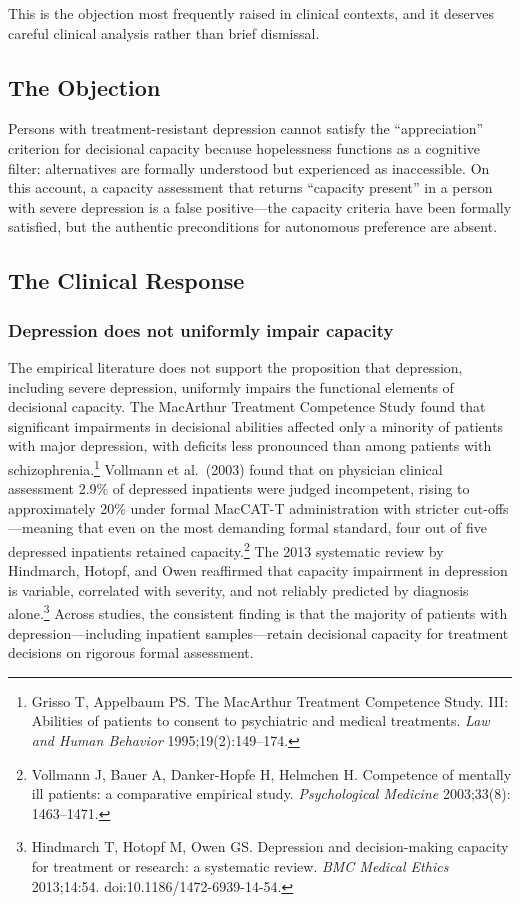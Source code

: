 \documentclass[11pt, letterpaper]{article}
\begin{document}
This is the objection most frequently raised in clinical contexts, and it deserves
careful clinical analysis rather than brief dismissal.

\subsection{The Objection}

Persons with treatment-resistant depression cannot satisfy the ``appreciation'' criterion
for decisional capacity because hopelessness functions as a cognitive filter: alternatives
are formally understood but experienced as inaccessible. On this account, a capacity
assessment that returns ``capacity present'' in a person with severe depression is a
false positive---the capacity criteria have been formally satisfied, but the authentic
preconditions for autonomous preference are absent.

\subsection{The Clinical Response}

\subsubsection{Depression does not uniformly impair capacity}

The empirical literature does not support the proposition that depression, including
severe depression, uniformly impairs the functional elements of decisional capacity.
The MacArthur Treatment Competence Study found that significant impairments in
decisional abilities affected only a minority of patients with major depression, with
deficits less pronounced than among patients with schizophrenia.\footnote{%
  Grisso T, Appelbaum PS. The MacArthur Treatment Competence Study. III: Abilities of
  patients to consent to psychiatric and medical treatments. \textit{Law and Human
  Behavior} 1995;19(2):149--174.}
Vollmann et al.\ (2003) found that on physician clinical assessment 2.9\% of depressed
inpatients were judged incompetent, rising to approximately 20\% under formal MacCAT-T
administration with stricter cut-offs---meaning that even on the most demanding formal
standard, four out of five depressed inpatients retained capacity.\footnote{%
  Vollmann J, Bauer A, Danker-Hopfe H, Helmchen H. Competence of mentally ill
  patients: a comparative empirical study. \textit{Psychological Medicine} 2003;33(8):
  1463--1471.}
The 2013 systematic review by Hindmarch, Hotopf, and Owen reaffirmed that capacity
impairment in depression is variable, correlated with severity, and not reliably
predicted by diagnosis alone.\footnote{%
  Hindmarch T, Hotopf M, Owen GS. Depression and decision-making capacity for treatment
  or research: a systematic review. \textit{BMC Medical Ethics} 2013;14:54.
  doi:10.1186/1472-6939-14-54.}
Across studies, the consistent finding is that the majority of patients with
depression---including inpatient samples---retain decisional capacity for treatment
decisions on rigorous formal assessment.
\end{document}
